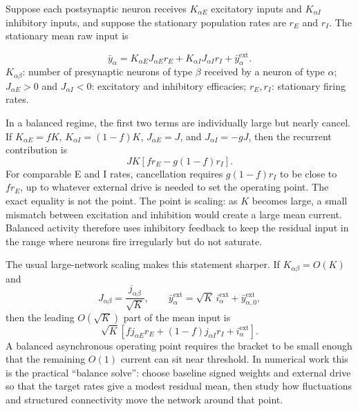 Suppose each postsynaptic neuron receives $K_{\alpha E}$ excitatory inputs and
$K_{\alpha I}$ inhibitory inputs, and suppose the stationary population rates
are $r_E$ and $r_I$. The stationary mean raw input is
%
\begin{keyequation}
\begin{equation}
  \bar y_\alpha
  =
  K_{\alpha E}J_{\alpha E}r_E
  +
  K_{\alpha I}J_{\alpha I}r_I
  +
  \bar y_{\alpha}^{\mathrm{ext}} .
  \label{eq:ch04-stationary-ei-mean-input}
\end{equation}
\tcblower
$K_{\alpha\beta}$: number of presynaptic neurons of type $\beta$ received by a
neuron of type $\alpha$; $J_{\alpha E}>0$ and $J_{\alpha I}<0$: excitatory and
inhibitory efficacies; $r_E,r_I$: stationary firing rates.
\end{keyequation}

\noindent In a balanced regime, the first two terms are individually large but
nearly cancel. If $K_{\alpha E}=fK$, $K_{\alpha I}=(1-f)K$,
$J_{\alpha E}=J$, and $J_{\alpha I}=-gJ$, then the recurrent contribution is
%
\begin{equation}
  JK\left[f r_E - g(1-f)r_I\right].
  \label{eq:ch04-simple-balance-condition}
\end{equation}
%
For comparable E and I rates, cancellation requires $g(1-f)r_I$ to be close to
$f r_E$, up to whatever external drive is needed to set the operating point.
The exact equality is not the point. The point is scaling: as $K$ becomes large,
a small mismatch between excitation and inhibition would create a large mean
current. Balanced activity therefore uses inhibitory feedback to keep the
residual input in the range where neurons fire irregularly but do not saturate.

The usual large-network scaling makes this statement sharper. If
$K_{\alpha\beta}=O(K)$ and
%
\begin{equation}
  J_{\alpha\beta}=\frac{j_{\alpha\beta}}{\sqrt{K}},
  \qquad
  \bar y_\alpha^{\mathrm{ext}}=\sqrt{K}\,i_\alpha^{\mathrm{ext}}+\bar y_{\alpha,0}^{\mathrm{ext}},
  \label{eq:ch04-balanced-scaling}
\end{equation}
%
then the leading $O(\sqrt{K})$ part of the mean input is
%
\begin{equation}
  \sqrt{K}
  \left[
    f j_{\alpha E}r_E
    +(1-f)j_{\alpha I}r_I
    +i_\alpha^{\mathrm{ext}}
  \right].
  \label{eq:ch04-leading-balance}
\end{equation}
%
A balanced asynchronous operating point requires the bracket to be small enough
that the remaining $O(1)$ current can sit near threshold. In numerical work this
is the practical ``balance solve'': choose baseline signed weights and external
drive so that the target rates give a modest residual mean, then study how
fluctuations and structured connectivity move the network around that point.

